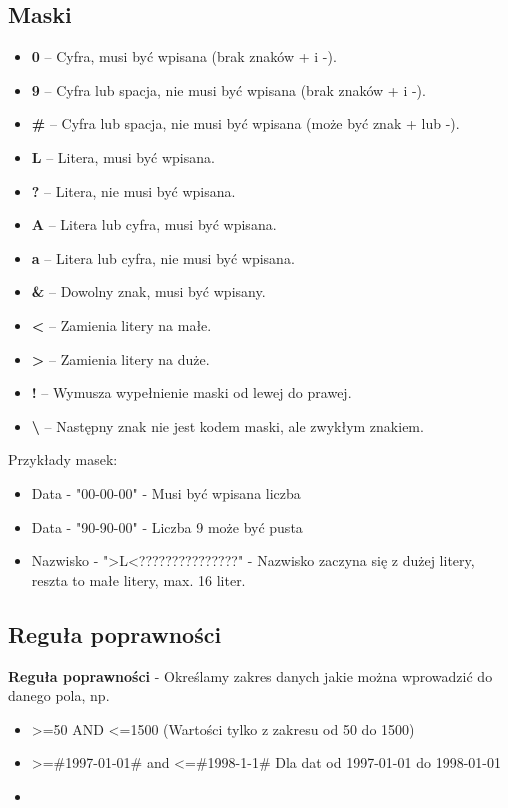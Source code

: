 \documentclass[12pt, a4paper]{article}
\begin{document}
\subsection*{Maski}
\begin{itemize}
  \item \textbf{0} – Cyfra, musi być wpisana (brak znaków + i -).
  \item \textbf{9} – Cyfra lub spacja, nie musi być wpisana (brak znaków + i -).
  \item \textbf{\#} – Cyfra lub spacja, nie musi być wpisana (może być znak + lub -).
  \item \textbf{L} – Litera, musi być wpisana.
  \item \textbf{?} – Litera, nie musi być wpisana.
  \item \textbf{A} – Litera lub cyfra, musi być wpisana.
  \item \textbf{a} – Litera lub cyfra, nie musi być wpisana.
  \item \textbf{\&} – Dowolny znak, musi być wpisany.
  \item \textbf{<} – Zamienia litery na małe.
  \item \textbf{>} – Zamienia litery na duże.
  \item \textbf{!} – Wymusza wypełnienie maski od lewej do prawej.
  \item \textbf{\textbackslash} – Następny znak nie jest kodem maski, ale zwykłym znakiem.
\end{itemize}
Przykłady masek:
\begin{itemize}
  \item Data - "00-00-00" - Musi być wpisana liczba
  \item Data - "90-90-00" - Liczba 9 może być pusta
  \item Nazwisko - ">L<???????????????" - Nazwisko zaczyna się z dużej litery, reszta to małe litery, max. 16 liter.
\end{itemize}
\subsection*{Reguła poprawności}
\textbf{Reguła poprawności} - Określamy zakres danych jakie można wprowadzić do danego pola, np.
\begin{itemize}
  \item >=50 AND <=1500 (Wartości tylko z zakresu od 50 do 1500)
  \item >=\#1997-01-01\# and <=\#1998-1-1\# Dla dat od 1997-01-01 do 1998-01-01
  \item
\end{itemize}
\end{document}

